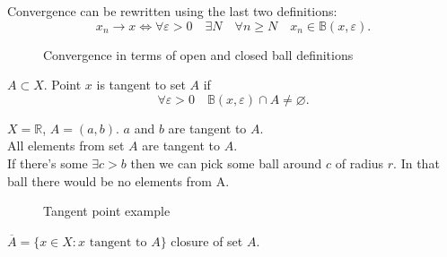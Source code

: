 Convergence can be rewritten using the last two definitions:
\[
x_n \to x \iff \forall \varepsilon > 0 \quad \exists N \quad
\forall n \geq N \quad x_n \in \mathbb{B}(x, \varepsilon)
.\] 

\begin{figure}[ht]
    \centering
    \caption{Convergence in terms of open and closed ball definitions}
    \label{fig:convergence-in-terms-of-open-and-closed-ball-definitions}
\end{figure}

\begin{definition}
    $A \subset X$. Point $x$ is tangent to set $A$ if \[
    \forall \varepsilon > 0 \quad \mathbb{B}(x, \varepsilon) \cap A \not= \varnothing
    .\] 
\end{definition}

\begin{example}
    $X = \mathbb{R}$, $A = (a, b)$. $a$ and $b$ are tangent to $A$. \\
    All elements from set $A$ are tangent to $A$. \\
    If there's some $\exists c > b$ then we can pick some ball around $c$
    of radius $r$. In that ball there would be no elements from A.
\end{example}
\begin{figure}[ht]
    \centering
    \caption{Tangent point example}
    \label{fig:tangent-point-example}
\end{figure}

\begin{definition}
    $\overline{A} = \{ x \in X : x \text{ tangent to } A \} $ closure of set $A$.
\end{definition}

